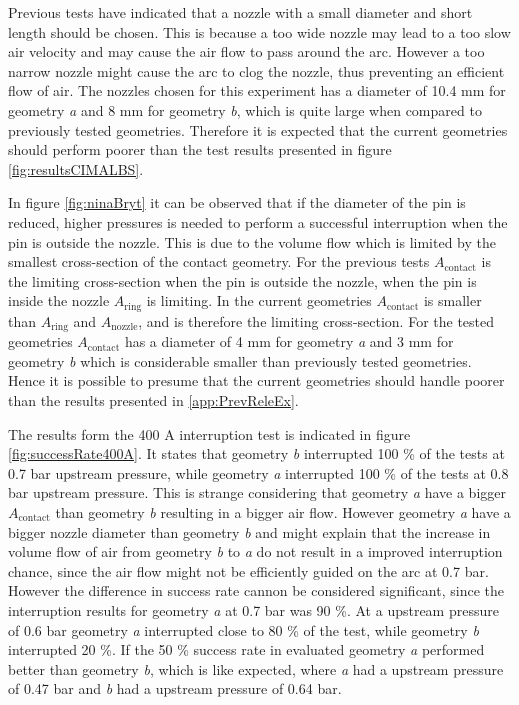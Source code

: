 \documentclass[10pt,a4paper,twoside]{article}
\begin{document}
Previous tests have indicated that a nozzle with a small diameter and short length should be chosen. This is because a too wide nozzle may lead to a too slow air velocity and may cause the air flow to pass around the arc. However a too narrow nozzle might cause the arc to clog the nozzle, thus preventing an efficient flow of air. The nozzles chosen for this experiment has a diameter of  10.4 mm for geometry \textit{a} and 8 mm for geometry \textit{b}, which is quite large when compared to previously tested geometries. Therefore it is expected that the current geometries should perform poorer than the test results presented in figure \ref{fig:resultsCIMALBS}.

In figure \ref{fig:ninaBryt} it can be observed that if the diameter of the pin is reduced, higher pressures is needed to perform a successful interruption when the pin is outside the nozzle. This is due to the volume flow which is limited by the smallest cross-section of the contact geometry. For the previous tests $A_\mathrm{{contact}}$ is the limiting cross-section when the pin is outside the nozzle, when the pin is inside the nozzle $A_\mathrm{{ring}}$ is limiting. In the current geometries $A_\mathrm{{contact}}$ is smaller than $A_\mathrm{{ring}}$ and $A_\mathrm{{nozzle}}$, and is therefore the limiting cross-section. For the tested geometries $A_\mathrm{{contact}}$ has a diameter of 4 mm for geometry \textit{a} and 3 mm for geometry \textit{b} which is considerable smaller than previously tested geometries. Hence it is possible to presume that the current geometries should handle poorer than the results presented in \ref{app:PrevReleEx}.

The results form the 400 A interruption test is indicated in figure \ref{fig:successRate400A}. It states that geometry \textit{b} interrupted 100 \% of the tests at 0.7 bar upstream pressure, while geometry \textit{a} interrupted 100 \% of the tests at 0.8 bar upstream pressure. This is strange considering that geometry \textit{a} have a bigger $A_\mathrm{{contact}}$ than geometry \textit{b} resulting in a bigger air flow. However geometry \textit{a} have a bigger nozzle diameter than geometry \textit{b} and might explain that the increase in volume flow of air from geometry \textit{b} to \textit{a} do not result in a improved interruption chance, since the air flow might not be efficiently guided on the arc at 0.7 bar. However the difference in success rate cannon be considered significant, since the interruption results for geometry \textit{a} at 0.7 bar was 90 \%. At a upstream pressure of 0.6 bar geometry \textit{a} interrupted close to 80 \% of the test, while geometry \textit{b} interrupted 20 \%. If the 50 \% success rate in evaluated geometry \textit{a} performed better than geometry \textit{b}, which is like expected, where \textit{a} had a upstream pressure of 0.47 bar and \textit{b} had a upstream pressure of 0.64 bar.
\end{document}
